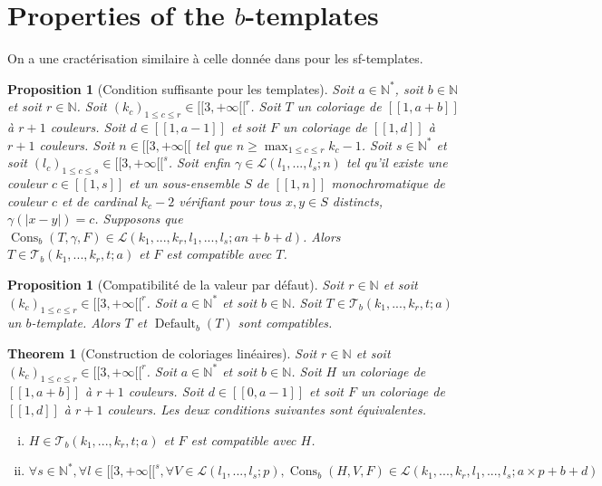 \documentclass{article}
\newtheorem{theorem}[definition]{Theorem}
\newtheorem{proposition}[definition]{Proposition}
\DeclareMathOperator{\cons}{Cons}
\DeclareMathOperator{\coldef}{Default}
\begin{document}
\section{Properties of the \(b\)-templates}
\label{sec:results}

On a une cractérisation similaire à celle donnée dans \cite{RowleyRamsey} pour les sf-templates.
\begin{proposition}[Condition suffisante pour les templates]
Soit \(a \in \mathbb{N}^*\), soit \(b \in \mathbb{N}\) et soit \(r \in \mathbb{N}\). Soit \((k_c)_{1 \leqslant c \leqslant r} \in {[\![3, + \infty [\![}^r\). Soit \(T\) un coloriage de \([\![1,  a + b]\!]\) à \(r + 1\) couleurs. Soit \(d \in [\![1, a - 1 ]\!]\) et soit \(F\) un coloriage de \([\![1, d]\!]\) à \(r + 1\) couleurs. Soit \(n \in [\![3, + \infty [\![\) tel que \(n \geqslant \max_{1 \leqslant c \leqslant r} k_c - 1\). Soit \(s \in \mathbb{N}^*\) et soit \((l_c)_{1 \leqslant c \leqslant s} \in {[\![3, + \infty [\![}^s\). Soit enfin \(\gamma \in \mathcal{L}(l_1, ..., l_s; n)\) tel qu'il existe une couleur \(c \in [\![1, s]\!]\) et un sous-ensemble \(S\) de \([\![1, n]\!]\) monochromatique de couleur \(c\) et de cardinal \(k_c - 2\) vérifiant pour tous \(x, y \in S\) distincts, \(\gamma(|x - y|) = c\). Supposons que \(\cons_b(T, \gamma, F) \in \mathcal{L}(k_1, ..., k_r, l_1, ..., l_s; a n + b + d)\). Alors \(T \in \mathcal{T}_b(k_1, ..., k_r, t; a)\) et \(F\) est compatible avec \(T\).
\end{proposition}

\begin{proposition}[Compatibilité de la valeur par défaut]
Soit \(r \in \mathbb{N}\) et soit \((k_c)_{1 \leqslant c \leqslant r}  \in {[\![3, +\infty[\![}^r\). Soit \(a \in \mathbb{N}^*\) et soit \(b \in \mathbb{N}\). Soit \(T \in \mathcal{T}_b(k_1, ..., k_r, t; a)\) un \(b\)-template. Alors \(T\) et \(\coldef_b(T)\) sont compatibles.
\end{proposition}

\begin{theorem}[Construction de coloriages linéaires]
\label{thm:b-temp}
Soit \(r \in \mathbb{N}\) et soit \((k_c)_{1 \leqslant c \leqslant r} \in {[\![3, +\infty[\![}^r\). Soit \(a \in \mathbb{N}^*\) et soit \(b \in \mathbb{N}\). Soit \(H\) un coloriage de \([\![1, a + b]\!]\) à \(r + 1\) couleurs. Soit \(d \in [\![0, a - 1]\!]\) et soit \(F\) un coloriage de \([\![1, d]\!]\) à \(r + 1\) couleurs. Les deux conditions suivantes sont équivalentes.

\begin{enumerate}[(i)]
\item \(H \in \mathcal{T}_b(k_1, ..., k_r, t; a)\) et \(F\) est compatible  avec \(H\).
\item \(\forall s \in \mathbb{N}^*, \forall l \in {[\![3, +\infty[\![}^s, \forall V \in \mathcal{L}(l_1, ..., l_s ; p), \cons_b(H, V, F) \in  \mathcal{L}(k_1, ..., k_r, l_1, ..., l_s ; a \times p + b + d)\)
\end{enumerate}
\end{theorem}
\end{document}
